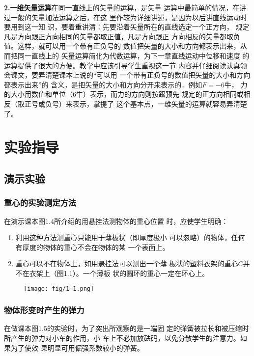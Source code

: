 \textbf{2.一维矢量运算}\quad   在同一直线上的矢量的运算，是矢量
运算中最简单的情况，在讲过一般的矢量加法运算之后，在这
里作较为详细讲述，是因为以后讲直线运动时要用到这一知
识，要着重讲清：先要沿着矢量所在的直线选定一个正方向，
规定凡是方向跟正方向相同的矢量都取正值，凡是方向跟正
方向相反的矢量都取负值。这样，就可以用一个带有正负号的
数值把矢量的大小和方向都表示出来，从而把同一直线上的
矢量运算简化为代数运算，为下一章直线运动中位移和速度
的运算提供了很大的方便。教学中应该引导学生重视这一节
内容并仔细阅读认真领会课文，要弄清楚课本上说的“可以用
一个带有正负号的数值把矢量的大小和方向都表示出来”的
含义，是把矢量的大小和方向分开来表示的．例如$F=-6$牛，
力的大小用数值和单位（6牛）表示，而力的方向则按跟预先
规定的正方向相同或相反（取正号或负号）来表示，掌提了
这个基本点，一维矢量的运算就容易弄清楚了。

\section{实验指导}
\subsection{演示实验}
\subsubsection{重心的实验测定方法}
在演示课本图1.4所介绍的用悬挂法测物体的重心位置
时，应使学生明确：
\begin{enumerate}
\item 利用这种方法测重心只能用于薄板状（即厚度极小
可以忽略）的物体，任何有厚度的物体的重心不会在物体的某
一个表面上。
\item 重心可以不在物体上，如用悬挂法可以测出一个薄
板状的塑料衣架的重心$C$并不在衣架上（图1.1）。一个薄板
状的圆环的重心一定在环心上。
\end{enumerate}

\begin{figure}[htp]
    \centering
\texttt{[image: fig/1-1.png]}
    \caption{}
\end{figure}


\subsubsection{物体形变时产生的弹力}
在做课本图1.5的实验时，为了突出所观察的是一端固
定的弹簧被拉长和被压缩时所产生的弹力对小车的作用，小
车上不必加放砝码，以免分散学生的注意力。如果为了使效
果明显可用倔强系数较小的弹簧。

